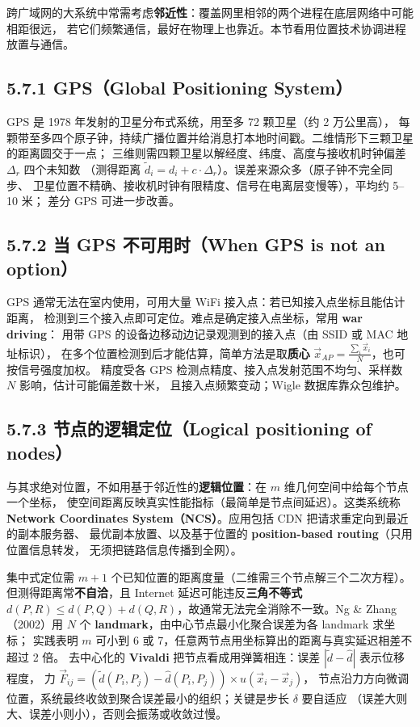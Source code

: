 

跨广域网的大系统中常需考虑\textbf{邻近性}：覆盖网里相邻的两个进程在底层网络中可能相距很远，
若它们频繁通信，最好在物理上也靠近。本节看用位置技术协调进程放置与通信。

\subsection*{5.7.1 GPS（Global Positioning System）}
GPS 是 1978 年发射的卫星分布式系统，用至多 72 颗卫星（约 2 万公里高），
每颗带至多四个原子钟，持续广播位置并给消息打本地时间戳。二维情形下三颗卫星的距离圆交于一点；
三维则需四颗卫星以解经度、纬度、高度与接收机时钟偏差 $\Delta_r$ 四个未知数
（测得距离 $\tilde{d}_i = d_i + c\cdot\Delta_r$）。误差来源众多（原子钟不完全同步、
卫星位置不精确、接收机时钟有限精度、信号在电离层变慢等），平均约 5–10 米；
差分 GPS 可进一步改善。

\subsection*{5.7.2 当 GPS 不可用时（When GPS is not an option）}
GPS 通常无法在室内使用，可用大量 WiFi 接入点：若已知接入点坐标且能估计距离，
检测到三个接入点即可定位。难点是确定接入点坐标，常用 \textbf{war driving}：
用带 GPS 的设备边移动边记录观测到的接入点（由 SSID 或 MAC 地址标识），
在多个位置检测到后才能估算，简单方法是取\textbf{质心}
$\vec{x}_{AP} = \frac{\sum_i \vec{x}_i}{N}$，也可按信号强度加权。
精度受各 GPS 检测点精度、接入点发射范围不均匀、采样数 $N$ 影响，估计可能偏差数十米，
且接入点频繁变动；Wigle 数据库靠众包维护。

\subsection*{5.7.3 节点的逻辑定位（Logical positioning of nodes）}
与其求绝对位置，不如用基于邻近性的\textbf{逻辑位置}：在 $m$ 维几何空间中给每个节点一个坐标，
使空间距离反映真实性能指标（最简单是节点间延迟）。这类系统称
\textbf{Network Coordinates System（NCS）}。应用包括 CDN 把请求重定向到最近的副本服务器、
最优副本放置、以及基于位置的 \textbf{position-based routing}（只用位置信息转发，
无须把链路信息传播到全网）。

\medskip\noindent 集中式定位需 $m+1$ 个已知位置的距离度量（二维需三个节点解三个二次方程）。
但测得距离常\textbf{不自洽}，且 Internet 延迟可能违反\textbf{三角不等式}
$d(P,R) \le d(P,Q) + d(Q,R)$，故通常无法完全消除不一致。Ng \& Zhang（2002）用
$N$ 个 \textbf{landmark}，由中心节点最小化聚合误差为各 landmark 求坐标；
实践表明 $m$ 可小到 6 或 7，任意两节点用坐标算出的距离与真实延迟相差不超过 2 倍。
去中心化的 \textbf{Vivaldi} 把节点看成用弹簧相连：误差 $|\tilde{d}-\hat{d}|$ 表示位移程度，
力 $\vec{F}_{ij} = (\tilde{d}(P_i,P_j) - \hat{d}(P_i,P_j)) \times u(\vec{x}_i - \vec{x}_j)$，
节点沿力方向微调位置，系统最终收敛到聚合误差最小的组织；关键是步长 $\delta$ 要自适应
（误差大则大、误差小则小），否则会振荡或收敛过慢。

